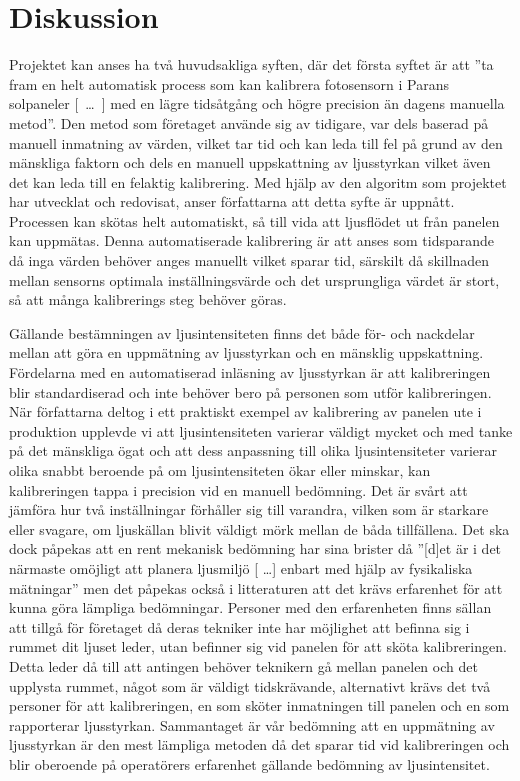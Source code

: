 \section{Diskussion} %
\label{sec:diskussion}

    Projektet kan anses ha två huvudsakliga syften, där det första syftet är att ''ta fram en helt automatisk process som kan kalibrera fotosensorn i Parans solpaneler [~\dots~] med en lägre tidsåtgång och högre precision än dagens manuella metod''. 
    Den metod som företaget använde sig av tidigare, var dels baserad på manuell inmatning av värden, vilket tar tid och kan leda till fel på grund av den mänskliga faktorn och dels en manuell uppskattning av ljusstyrkan vilket även det kan leda till en felaktig kalibrering. 
    Med hjälp av den algoritm som projektet har utvecklat och redovisat, anser författarna att detta syfte är uppnått. Processen kan skötas helt automatiskt, så till vida att ljusflödet ut från panelen kan uppmätas. 
    Denna automatiserade kalibrering är att anses som tidsparande då inga värden behöver anges manuellt vilket sparar tid, särskilt då skillnaden mellan sensorns optimala inställningsvärde och det ursprungliga värdet är stort, så att många kalibrerings steg behöver göras. \bigskip

    Gällande bestämningen av ljusintensiteten finns det både för- och nackdelar mellan att göra en uppmätning av ljusstyrkan och en mänsklig uppskattning. Fördelarna med en automatiserad inläsning av ljusstyrkan är att kalibreringen blir standardiserad och inte behöver bero på personen som utför kalibreringen. När författarna deltog i ett praktiskt exempel av kalibrering av panelen ute i produktion upplevde vi att ljusintensiteten varierar väldigt mycket och med tanke på det mänskliga ögat och att dess anpassning till olika ljusintensiteter varierar olika snabbt beroende på om ljusintensiteten ökar eller minskar, kan kalibreringen tappa i precision vid en manuell bedömning.\cite[s.~273]{aot}  Det är svårt att jämföra hur två inställningar förhåller sig till varandra, vilken som är starkare eller svagare, om ljuskällan blivit väldigt mörk mellan de båda tillfällena. Det ska dock påpekas att en rent mekanisk bedömning har sina brister då ''[d]et är i det närmaste omöjligt att planera ljusmiljö [ \dots ] enbart med hjälp av fysikaliska mätningar'' men det påpekas också i litteraturen att det krävs erfarenhet för att kunna göra lämpliga bedömningar. \cite[s.~278]{aot} Personer med den erfarenheten finns sällan att tillgå för företaget då deras tekniker inte har möjlighet att befinna sig i rummet dit ljuset leder, utan befinner sig vid panelen för att sköta kalibreringen. Detta leder då till att antingen behöver teknikern gå mellan panelen och det upplysta rummet, något som är väldigt tidskrävande, alternativt krävs det två personer för att kalibreringen, en som sköter inmatningen till panelen och en som rapporterar ljusstyrkan. Sammantaget är vår bedömning att en uppmätning av ljusstyrkan är den mest lämpliga metoden då det sparar tid vid kalibreringen och blir oberoende på operatörers erfarenhet gällande bedömning av ljusintensitet.

